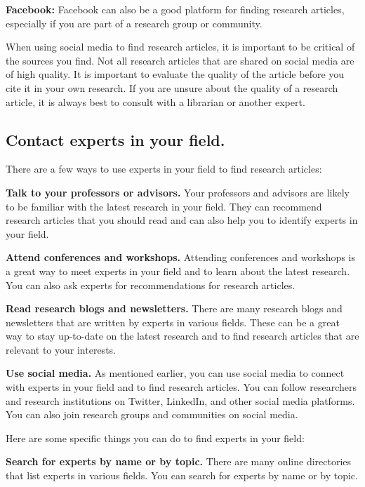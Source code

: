 \documentclass[
  b5paper]{book}
\begin{document}
\textbf{Facebook:} Facebook can also be a good platform for finding research articles, especially if you are part of a research group or community.

When using social media to find research articles, it is important to be critical of the sources you find. Not all research articles that are shared on social media are of high quality. It is important to evaluate the quality of the article before you cite it in your own research. If you are unsure about the quality of a research article, it is always best to consult with a librarian or another expert.

\hypertarget{contact-experts-in-your-field.}{%
\subsection*{Contact experts in your field.}\label{contact-experts-in-your-field.}}

There are a few ways to use experts in your field to find research articles:

\textbf{Talk to your professors or advisors.} Your professors and advisors are likely to be familiar with the latest research in your field. They can recommend research articles that you should read and can also help you to identify experts in your field.

\textbf{Attend conferences and workshops.} Attending conferences and workshops is a great way to meet experts in your field and to learn about the latest research. You can also ask experts for recommendations for research articles.

\textbf{Read research blogs and newsletters.} There are many research blogs and newsletters that are written by experts in various fields. These can be a great way to stay up-to-date on the latest research and to find research articles that are relevant to your interests.

\textbf{Use social media.} As mentioned earlier, you can use social media to connect with experts in your field and to find research articles. You can follow researchers and research institutions on Twitter, LinkedIn, and other social media platforms. You can also join research groups and communities on social media.

Here are some specific things you can do to find experts in your field:

\textbf{Search for experts by name or by topic.} There are many online directories that list experts in various fields. You can search for experts by name or by topic.
\end{document}
